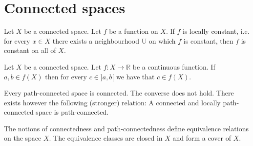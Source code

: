 \section{Connected spaces}


    \begin{property}
        Let $X$ be a connected space. Let $f$ be a function on $X$. If $f$ is locally constant, i.e. for every $x\in X$ there exists a neighbourhood U on which $f$ is constant, then $f$ is constant on all of $X$.
    \end{property}

    \begin{theorem}\label{topology:theorem:intermediate_value_theorem}
        Let $X$ be a connected space. Let $f:X\rightarrow\mathbb{R}$ be a continuous function. If $a, b\in f(X)$ then for every $c\in ]a, b[$ we have that $c\in f(X)$.
    \end{theorem}


    \begin{property}
        Every path-connected space is connected. The converse does not hold. There exists however the following (stronger) relation: A connected and locally path-connected space is path-connected.
    \end{property}

    \begin{remark}
        The notions of connectedness and path-connectedness define equivalence relations on the space $X$. The equivalence classes are closed in $X$ and form a cover of $X$.
    \end{remark}

